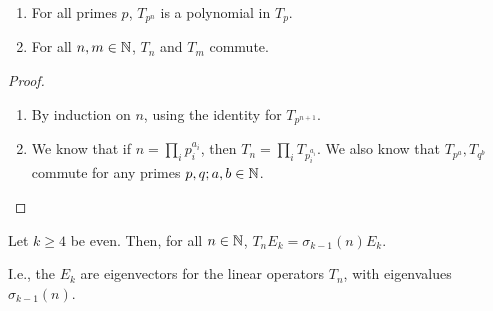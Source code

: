 \documentclass[10pt,a4paper]{article}
\begin{document}
\begin{corollary}
  \begin{enumerate}
    \item For all primes $p$, $T_{p^n}$ is a polynomial in $T_p$.
    \item For all $n,m \in\mathbb{N}$, $T_n$ and $T_m$ commute.
  \end{enumerate}
\end{corollary}
\begin{proof}
  \begin{enumerate}
    \item By induction on $n$, using the identity for $T_{p^{n+1}}$.
    \item We know that if $n = \prod_i p_i^{a_i}$, then $T_n = \prod_i T_{p_i^{a_i}}$. We also know that $T_{p^a}, T_{q^b}$ commute for any primes $p,q; a,b \in \mathbb{N}$.
  \end{enumerate}
\end{proof}
\begin{proposition}
  Let $k \geq 4$ be even. Then, for all $n \in \mathbb{N}$, $T_n E_k = \sigma_{k-1}(n)E_k$.
\end{proposition}
I.e., the $E_k$ are eigenvectors for the linear operators $T_n$, with eigenvalues $\sigma_{k-1}(n)$.
\end{document}
